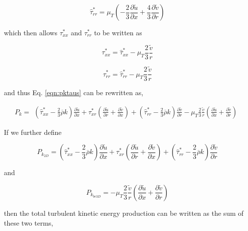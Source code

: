 \begin{equation}
	\hat{\tau}^*_{rr} = \mu_T(-\frac{2}{3}\frac{\partial \tilde u}{\partial x}+\frac{4}{3}\frac{\partial \tilde v}{\partial r})
\label{eqn:taurrhatstar}
\end{equation}

	which then allows $\tau^*_{xx}$ and $\tau^*_{rr}$ to be written as

\begin{equation}
	\tau^*_{xx} = \hat{\tau}^*_{xx} - \mu_T \frac{2}{3} \frac{\tilde v}{r}
\label{eqn:tauxxstar}
\end{equation}

\begin{equation}
	\tau^*_{rr} = \hat{\tau}^*_{rr} - \mu_T \frac{2}{3} \frac{\tilde v}{r}
\label{eqn:taurrstar}
\end{equation}

	and thus Eq. \ref{eqn:pktaus} can be rewritten as,

\begin{displaymath}
	P_k = 
	\begin{array}{c}
	(\hat{\tau}^*_{xx} -\frac{2}{3}\overline{\rho}k) \frac{\partial \tilde u}{\partial x}  
	+ \tau^*_{xr} (\frac{\partial \tilde u}{\partial r} + \frac{\partial \tilde v}{\partial x})
	+ (\hat{\tau}^*_{rr} -\frac{2}{3}\overline{\rho}k) \frac{\partial \tilde v}{\partial r}
	-\mu_T\frac{2}{3}\frac{\tilde v}{r}(\frac{\partial \tilde u}{\partial x} + \frac{\partial \tilde v}{\partial r})
	\end{array}
\end{displaymath} 

	If we further define

\begin{equation}
	P_{k_{2D}} = (\hat{\tau}^*_{xx} -\frac{2}{3}\overline{\rho}k) \frac{\partial \tilde u}{\partial x}  
	+ \tau^*_{xr} (\frac{\partial \tilde u}{\partial r} + \frac{\partial \tilde v}{\partial x})
	+ (\hat{\tau}^*_{rr} -\frac{2}{3}\overline{\rho}k) \frac{\partial \tilde v}{\partial r}
\label{eqn:pk2d}
\end{equation}

	and

\begin{equation}
	P_{k_{be3D}} = -\mu_T\frac{2}{3}\frac{\tilde v}{r}(\frac{\partial \tilde u}{\partial x} + \frac{\partial \tilde v}
	{\partial r})
\label{eqn:pkbe3d}
\end{equation}

	then the total turbulent kinetic energy production can be written as the sum of these two terms,

